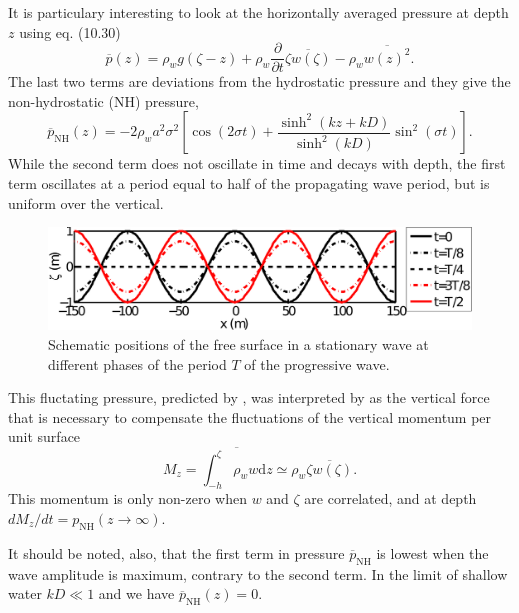 It is particulary interesting to look at the horizontally averaged pressure at depth $z$ using eq. 
(10.30)  %
\begin{equation}
\overline{p}(z)= \rho_w g (\zeta -z) + \rho_w \frac{\partial }{\partial t}\overline{\zeta w(\zeta)} -\rho_w \overline{w(z)^2}.
\end{equation}
The last two terms are deviations from the hydrostatic pressure and they give the non-hydrostatic (NH) pressure,  
\begin{equation}
\overline{p}_{\mathrm{NH}}(z)=-2 \rho_w  a^2 \sigma^2 \left[   \cos(2 \sigma t)  + \frac{\sinh^2(kz+kD)}{\sinh^2(kD)}  \sin^2(\sigma t)   \right].\label{sismo:p_NH}
\end{equation}
While the second term does not oscillate in time and decays with depth, the first term 
oscillates at a period equal to half of the propagating wave period, but is uniform over the vertical. 
\begin{figure}
\centerline{\includegraphics[width=\textwidth]{FIGS_CH_SISMO/standing_wave.pdf}}
  \caption{Schematic positions of the free surface in a stationary wave at different phases of the period $T$ of the progressive wave.}
\label{fig:standing}
\end{figure}

This fluctating pressure, predicted by \cite{Miche1944b}, was interpreted by \cite{Longuet-Higgins1950} as the vertical force that is necessary 
to compensate the fluctuations of the vertical momentum per unit surface 
\begin{equation}
M_z=\overline{\int_{-h}^{\zeta}\rho_w w {\mathrm d}z} \simeq \rho_w \overline{\zeta w(\zeta)}.
\end{equation}
This momentum is only non-zero when  $w$ and $\zeta$ are correlated, and at depth $d M_z /dt = p_{\mathrm{NH}} (z \rightarrow \infty)$. 

It should be noted, also, that the first term in pressure $\overline{p}_{\mathrm{NH}}$ is lowest when the wave amplitude is maximum, contrary to the second term. 
In the limit of shallow water $kD \ll 1$ and we have $\overline{p}_{\mathrm{NH}}(z) = 0$.  

